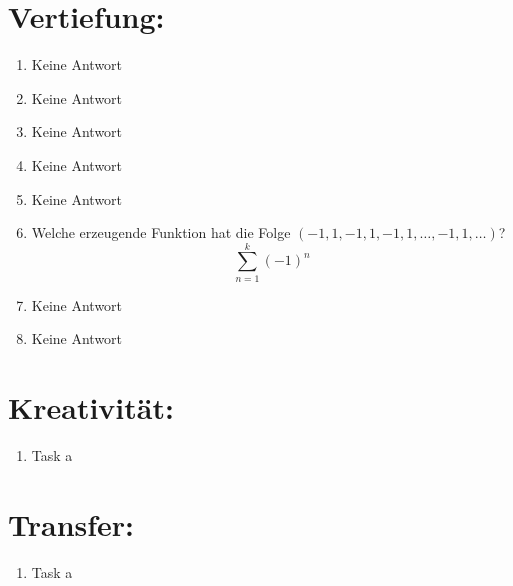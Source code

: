 



    \maketitle
    \section*{Vertiefung:}
    \begin{enumerate}[label=(\alph*)]
        \item Keine Antwort

        \item Keine Antwort

        \item Keine Antwort

        \item Keine Antwort

        \item Keine Antwort

        \item Welche erzeugende Funktion hat die Folge $(-1, 1, -1, 1, -1, 1, \ldots , -1, 1, \ldots )$?\\
        \[\sum_{n=1}^{k} (-1)^n\]

        \item Keine Antwort

        \item Keine Antwort
    \end{enumerate}
    \section*{Kreativität:}
    \begin{enumerate}[label=(\alph*)]
        \item Task a
    \end{enumerate}
    \section*{Transfer:}
    \begin{enumerate}[label=(\alph*)]
        \item Task a
    \end{enumerate}







